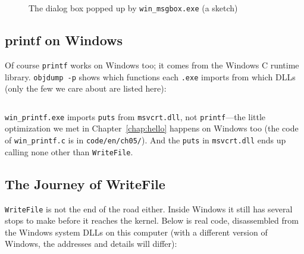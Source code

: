 \begin{figure}[htbp]
  \centering
  \caption{The dialog box popped up by \texttt{win\_msgbox.exe} (a sketch)}
  \label{fig:msgbox}
\end{figure}

\subsection{printf on Windows}

Of course \texttt{printf} works on Windows too; it comes from the Windows C runtime library. \texttt{objdump -p} shows which functions each \texttt{.exe} imports from which DLLs (only the few we care about are listed here):
\inputminted[linenos=false]{text}{code/en/ch05/out/win_imports.txt}

\texttt{win\_printf.exe} imports \texttt{puts} from \texttt{msvcrt.dll}, not \texttt{printf}---the little optimization we met in Chapter~\ref{chap:hello} happens on Windows too (the code of \texttt{win\_printf.c} is in \texttt{code/en/ch05/}). And the \texttt{puts} in \texttt{msvcrt.dll} ends up calling none other than \texttt{WriteFile}.

\subsection{The Journey of WriteFile}

\texttt{WriteFile} is not the end of the road either. Inside Windows it still has several stops to make before it reaches the kernel. Below is real code, disassembled from the Windows system DLLs on this computer (with a different version of Windows, the addresses and details will differ):
\inputminted[linenos=false]{text}{code/en/ch05/out/win_chain.txt}

